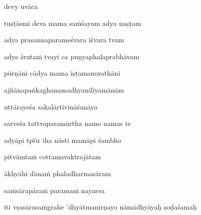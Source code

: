 \vers

devy uvāca~{\dandab}\dontdisplaylinenum 

\nemsloka 
tuṣṭāsmi deva mama sa\.mśayam adya naṣṭam
\dontdisplaylinenum

\nemslokab 
adya prasannaparameśvara īśvara tvam \danda\dontdisplaylinenum

\nemslokac 
adya śruta\.m tvayi ca puṇyaphalaprabhāvam
\dontdisplaylinenum
            \var{\vc \om\ \msCb}%

\nemslokad 
pūrṇāni cādya mama iṣṭamanorathāni \veg\dontdisplaylinenum

\ujvers\nemsloka 
ajñānapaṅkaghanamadhyanilīyamānām
\dontdisplaylinenum

\nemslokab 
uttārayeśa sakalārtivināśanāya \danda\dontdisplaylinenum

\nemslokac 
sarveśa tattvaparamārtha namo namas te
\dontdisplaylinenum

\nemslokad 
adyāpi tptir iha nāsti mamāpi śambho \veg\dontdisplaylinenum

\ujvers\nemsloka 
pītvāmta\.m cottamavaktrajātam
\dontdisplaylinenum

\nemslokab 
ākhyāhi dāna\.m phaladharmasāram \danda\dontdisplaylinenum

\nemslokad 
sa\.msārapāra\.m parama\.m nayasva \veg\dontdisplaylinenum

\vers


\jump
\begin{center}
\ketdanda iti vṣasārasa\.mgrahe 'dhyātmanirṇayo nāmādhyāyaḥ ṣoḍaśamaḥ\ketdanda
\end{center}
\dontdisplaylinenum\vers 

